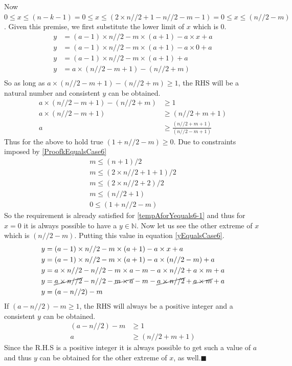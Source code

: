 \documentclass[10pt, twoside]{article}
\begin{document}
Now $0 \leq x \leq (n-k-1) = 0 \leq x \leq (2\times n//2+1-n//2-m-1) = 0 \leq x \leq (n//2 -m)$. Given this premise, we first substitute the lower limit of $x$ which is $0$.
\begin{align*}
	y &= (a-1)\times n//2 -m\times(a+1) - a\times x + a \\
	y &= (a-1)\times n//2 -m\times(a+1) - a\times 0 + a \\
	y &= (a-1)\times n//2 -m\times(a+1) + a \\
	y &= a\times(n//2-m+1) - (n//2+m) \\
\end{align*}
So as long as $a\times(n//2-m+1) - (n//2+m) \geq 1$, the RHS will be a natural number and consistent $y$ can be obtained.
\begin{align}
	a\times(n//2-m+1) - (n//2+m) &\geq 1 \nonumber \\
	a\times(n//2-m+1) &\geq (n//2+m+1) \nonumber \\
	a &\geq \frac{(n//2+m+1)}{(n//2-m+1)} \label{tempAforYequals6-1}
\end{align}
Thus for the above to hold true $(1+n//2-m) \geq 0$.\newline
Due to constraints imposed by \eqref{ProofkEqualsCase6} 
\begin{align*}
	m \leq (n+1)/2 \\
	m \leq (2\times n//2 + 1 +1)/2 \\
	m \leq (2\times n//2 + 2)/2 \\
	m \leq (n//2+1) \\
	0 \leq (1+n//2-m)
\end{align*}
So the requirement is already satisfied for \eqref{tempAforYequals6-1} and thus for $x=0$ it is always possible to have a $y \in \mathbb{N}$. Now let us see the other extreme of $x$ which is $(n//2-m)$. Putting this value in equation \eqref{yEqualsCase6}.
\begin{align*}
	y &= (a-1)\times n//2 -m\times(a+1) - a\times x + a \\
	y &= (a-1)\times n//2 -m\times(a+1) - a\times(n//2-m) + a\\
	y &= a\times n//2 -n//2 -m\times a - m -a\times n//2 +a\times m + a \\
	y &= \cancel{a\times n//2} -n//2 -\cancel{m\times a} - m -\cancel{a\times n//2} +\cancel{a\times m} + a \\
	y &= (a - n//2) -m 
\end{align*}
If $(a - n//2) -m \geq 1$, the RHS will always be a positive integer and a consistent $y$ can be obtained.
\begin{align}
	(a - n//2) -m  &\geq 1 \nonumber \\
	a &\geq (n//2+m+1) \label{tempAforYequals6-2}
\end{align}
Since the R.H.S is a positive integer it is always possible to get such a value of $a$ and thus $y$ can be obtained for the other extreme of $x$, as well.$\blacksquare$
\end{document}
